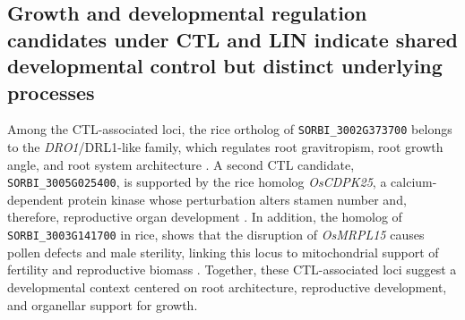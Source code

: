 \documentclass[9pt,twocolumn,twoside]{rilabRxiv}
\begin{document}



\subsection{Growth and developmental regulation candidates under CTL and LIN indicate shared developmental control but distinct underlying processes}

Among the CTL-associated loci, the rice ortholog of \texttt{SORBI\_3002G373700} belongs to the \textit{DRO1}/DRL1-like family, which regulates root gravitropism, root growth angle, and root system architecture \citep{Kitomi2020}. A second CTL candidate, \texttt{SORBI\_3005G025400}, is supported by the rice homolog \textit{OsCDPK25}, a calcium-dependent protein kinase whose perturbation alters stamen number and, therefore, reproductive organ development \citep{Zhang2014}. In addition, the homolog of \texttt{SORBI\_3003G141700}  in rice, shows that the disruption of \textit{OsMRPL15} causes pollen defects and male sterility, linking this locus to mitochondrial support of fertility and reproductive biomass \citep{Xie2023}. Together, these CTL-associated loci suggest a developmental context centered on root architecture, reproductive development, and organellar support for growth.
\end{document}
